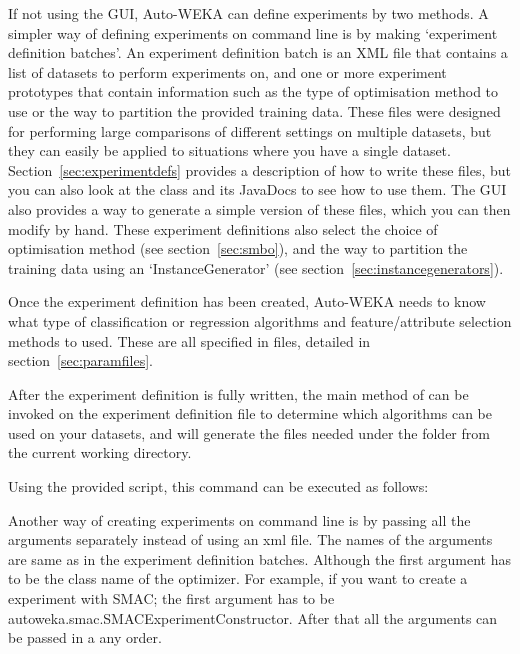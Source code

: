  
If not using the GUI, Auto-WEKA can define experiments by two methods. A simpler way of defining experiments on command line is by making `experiment definition batches'. An experiment definition batch is an XML file that contains a list of datasets to perform experiments on, and one or more experiment prototypes that contain information such as the type of optimisation method to use or the way to partition the provided training data. These files were designed for performing large comparisons of different settings on multiple datasets, but they can easily be applied to situations where you have a single dataset. Section~\ref{sec:experimentdefs} provides a description of how to write these files, but you can also look at the  class and its JavaDocs to see how to use them. The GUI also provides a way to generate a simple version of these files, which you can then modify by hand. These experiment definitions also select the choice of optimisation method (see section~\ref{sec:smbo}), and the way to partition the training data using an `InstanceGenerator' (see section~\ref{sec:instancegenerators}).

Once the experiment definition has been created, Auto-WEKA needs to know what type of classification or regression algorithms and feature/attribute selection methods to used. These are all specified in  files, detailed in section~\ref{sec:paramfiles}.

After the experiment definition is fully written, the main method of  can be invoked on the experiment definition file to determine which algorithms can be used on your datasets, and will generate the files needed under the  folder from the current working directory. 

\begin{aside}
  Using the provided script, this command can be executed as follows: \\
\end{aside}

Another way of creating experiments on command line is by passing all the arguments separately instead of using an xml file. The names of the arguments are same as in the experiment definition batches. Although the first argument has to be the class name of the optimizer. For example, if you want to create a experiment with SMAC; the first argument has to be autoweka.smac.SMACExperimentConstructor. After that all the arguments can be passed in a any order.

